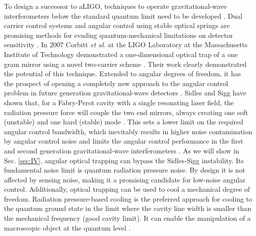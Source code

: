 To design a successor to aLIGO, techniques to operate gravitational-wave interferometers below 
the standard quantum limit need to be developed \cite{Dan12, Chen13}. Dual carrier control systems and angular control 
using stable optical springs are promising methods for evading quantum-mechanical limitations on 
detector sensitivity \cite{LIGO10, Braginsky02b, Arcizet06b, Corbitt06b, Kippenberg05, Sheard04}. 
In 2007 Corbitt \emph{et al}. at the LIGO Laboratory at the Massachusetts Institute of Technology 
demonstrated a one-dimensional optical trap of a one gram mirror using a novel two-carrier scheme \cite{Corbitt07}. 
Their work 
clearly demonstrated the potential of this technique. Extended to angular degrees of freedom, it has 
the prospect of opening a completely new approach to the angular control problem in future generation 
gravitational-wave detectors \cite{Punturo10}. 
Sidles and Sigg have shown that, for a Fabry-Perot cavity with a single 
resonating laser field, the radiation pressure force will couple the two end mirrors, always creating one 
soft (unstable) and one hard (stable) mode \cite{Sidles06}. This sets a lower limit on the required angular control 
bandwidth, which inevitably results in higher noise contamination by angular control noise and limits the angular control performance in the first and second generation 
gravitational-wave interferometers \cite{LIGO10, Braginsky01, Dooley13, Hirose10}. 
As we will show in Sec. \ref{sec:IV}, angular optical trapping can bypass the Sidles-Sigg instability. Its fundamental noise limit is quantum radiation pressure noise. By design it is not affected by sensing noise, making it a promising candidate for low-noise angular control.
Additionally, 
optical trapping can be used to cool a mechanical degree of freedom. Radiation pressure-based cooling is the preferred approach for cooling to the quantum ground state in the limit where the cavity line width is smaller than the mechanical frequency  (good cavity limit)\cite{Genes08}. It can enable the manipulation of a macroscopic object at the quantum level \cite{Teufel11, OConnell10, Chan11, TCorbitt07, Matsumoto13}. 
